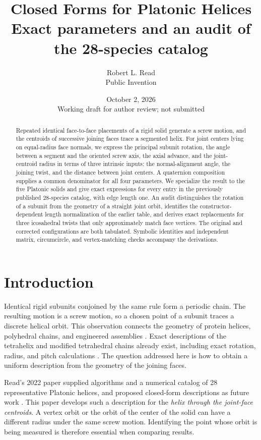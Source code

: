 \documentclass[11pt]{article}
\title{Closed Forms for Platonic Helices\\[0.4em]
 \large Exact parameters and an audit of the 28-species catalog}
\author{Robert L. Read\\\small Public Invention}
\date{October 2, 2026\\\small Working draft for author review; not submitted}
\theoremstyle{definition}
\begin{document}
\maketitle
\begin{abstract}
Repeated identical face-to-face placements of a rigid solid generate a screw
motion, and the centroids of successive joining faces trace a segmented helix.
For joint centers lying on equal-radius face normals, we express the principal
subunit rotation, the angle between a segment and the oriented screw axis, the
axial advance, and the joint-centroid radius in terms of three intrinsic inputs:
the normal-alignment angle, the joining twist, and the distance between joint
centers. A quaternion composition supplies a common denominator for all four
parameters. We specialize the result to the five Platonic solids and give exact
expressions for every entry in the previously published 28-species catalog,
with edge length one. An audit distinguishes the rotation of a subunit from the
geometry of a straight joint orbit, identifies the constructor-dependent length
normalization of the earlier table, and derives exact replacements for three
icosahedral twists that only approximately match face vertices. The original
and corrected configurations are both tabulated. Symbolic identities and
independent matrix, circumcircle, and vertex-matching checks accompany the
derivations.
\end{abstract}

\section{Introduction}
Identical rigid subunits conjoined by the same rule form a periodic chain.
The resulting motion is a screw motion, so a chosen point of a subunit traces
a discrete helical orbit. This observation connects the geometry of protein
helices, polyhedral chains, and engineered assemblies
\cite{lord2002,dauter2018,read2022}. Exact descriptions of the tetrahelix and
modified tetrahedral chains already exist, including exact rotation, radius,
and pitch calculations \cite{sadler2019,onaka2024}. The question addressed here
is how to obtain a uniform description from the geometry of the joining faces.

Read's 2022 paper supplied algorithms and a numerical catalog of 28
representative Platonic helices, and proposed closed-form descriptions as
future work \cite{read2022}. This paper develops such a description for the
\emph{helix through the joint-face centroids}. A vertex orbit or the orbit of
the center of the solid can have a different radius under the same screw
motion. Identifying the point whose orbit is being measured is therefore
essential when comparing results.
\end{document}
